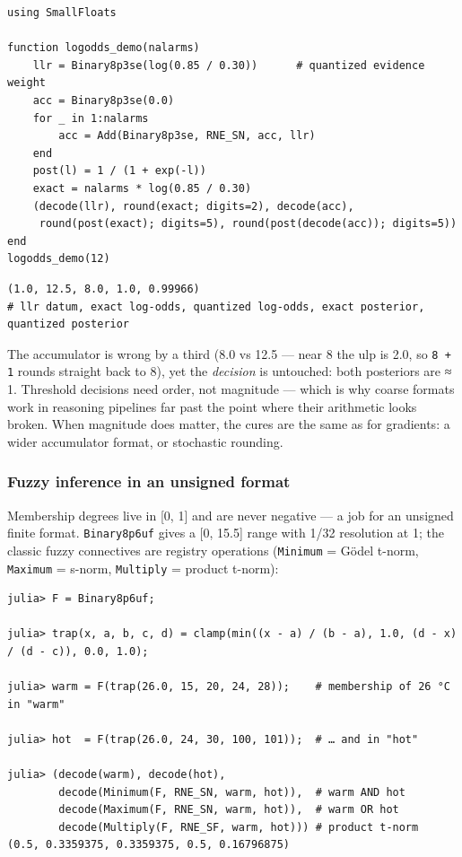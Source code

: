 \nopagebreak[4]
\begin{minipage}{\linewidth}
\begin{verbatim}
using SmallFloats

function logodds_demo(nalarms)
    llr = Binary8p3se(log(0.85 / 0.30))      # quantized evidence weight
    acc = Binary8p3se(0.0)
    for _ in 1:nalarms
        acc = Add(Binary8p3se, RNE_SN, acc, llr)
    end
    post(l) = 1 / (1 + exp(-l))
    exact = nalarms * log(0.85 / 0.30)
    (decode(llr), round(exact; digits=2), decode(acc),
     round(post(exact); digits=5), round(post(decode(acc)); digits=5))
end
logodds_demo(12)
\end{verbatim}




\begin{verbatim}
(1.0, 12.5, 8.0, 1.0, 0.99966)
# llr datum, exact log-odds, quantized log-odds, exact posterior, quantized posterior
\end{verbatim}
\end{minipage}




The accumulator is wrong by a third (8.0 vs 12.5 — near 8 the ulp is 2.0, so \texttt{8 + 1} rounds straight back to 8), yet the \emph{decision} is untouched: both posteriors are ≈ 1. Threshold decisions need order, not magnitude — which is why coarse formats work in reasoning pipelines far past the point where their arithmetic looks broken. When magnitude does matter, the cures are the same as for gradients: a wider accumulator format, or stochastic rounding.



\subsubsection{Fuzzy inference in an unsigned format}



\label{10838530668520339695}{}


Membership degrees live in [0, 1] and are never negative — a job for an unsigned finite format. \texttt{Binary8p6uf} gives a [0, 15.5] range with 1/32 resolution at 1; the classic fuzzy connectives are registry operations (\texttt{Minimum} = Gödel t-norm, \texttt{Maximum} = s-norm, \texttt{Multiply} = product t-norm):




\nopagebreak[4]
\begin{verbatim}
julia> F = Binary8p6uf;

julia> trap(x, a, b, c, d) = clamp(min((x - a) / (b - a), 1.0, (d - x) / (d - c)), 0.0, 1.0);

julia> warm = F(trap(26.0, 15, 20, 24, 28));    # membership of 26 °C in "warm"

julia> hot  = F(trap(26.0, 24, 30, 100, 101));  # … and in "hot"

julia> (decode(warm), decode(hot),
        decode(Minimum(F, RNE_SN, warm, hot)),  # warm AND hot
        decode(Maximum(F, RNE_SN, warm, hot)),  # warm OR hot
        decode(Multiply(F, RNE_SF, warm, hot))) # product t-norm
(0.5, 0.3359375, 0.3359375, 0.5, 0.16796875)
\end{verbatim}



